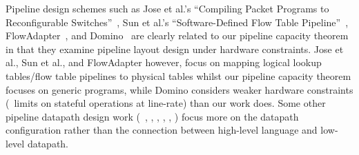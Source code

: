 
 Pipeline design schemes such as Jose et al.'s ``Compiling Packet Programs to Reconfigurable Switches''~\cite{Jose-et-al}, Sun et al.'s ``Software-Defined Flow Table Pipeline''~\cite{Sun-et-al}, FlowAdapter~\cite{FlowAdapter}, and Domino~\cite{Domino} are clearly related to our pipeline capacity theorem in that they examine pipeline layout design under hardware constraints. Jose et al., Sun et al., and FlowAdapter  however, focus on mapping logical lookup tables/flow table pipelines to physical tables whilst our pipeline capacity theorem focuses on generic programs, while Domino considers weaker hardware constraints (\eg\ limits on stateful operations at line-rate) than our work does. Some other pipeline datapath design work (\eg\ \cite{Pan2017FlowConvertor}, \cite{Wang2017P4FPGA}, \cite{patra2018towards}, \cite{shahpcube}, \cite{da2017data}, \cite{pontarelli2017smashing}) focus more on the datapath configuration rather than the connection between high-level language and low-level datapath.
